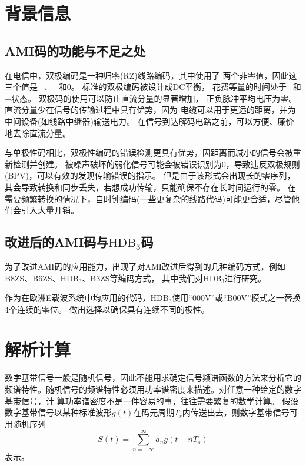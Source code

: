 \documentclass[AutoFakeBold]{LZUThesis}
\begin{document}
\section{背景信息}

\subsection{AMI码的功能与不足之处}

在电信中，双极编码是一种归零(RZ)线路编码，其中使用了
两个非零值，因此这三个值是$+$、$-$和0。
标准的双极编码被设计成DC平衡，
花费等量的时间处于$+$和$-$状态。
双极码的使用可以防止直流分量的显著增加，
正负脉冲平均电压为零。直流分量少在信号的传输过程中具有优势，因为
电缆可以用于更远的距离，并为中间设备(如线路中继器)输送电力。
在信号到达解码电路之前，可以方便、廉价地去除直流分量。\cite{enwiki:2}

与单极性码相比，双极性编码的错误检测更具有优势，因距离而减小的信号会被重新检测并创建。
被噪声破坏的弱化信号可能会被错误识别为0，导致违反双极规则(BPV)，可以有效的发现传输错误的指示。
但是由于该形式会出现长的零序列，其会导致转换和同步丢失，若想成功传输，只能确保不存在长时间运行的零。
在需要频繁转换的情况下，自时钟编码(一些更复杂的线路代码)可能更合适，尽管他们会引入大量开销。

\subsection{改进后的AMI码与$\mathrm{HDB_3}$码}

为了改进AMI码的应用能力，出现了对AMI改进后得到的几种编码方式，例如B8ZS、B6ZS、$\mathrm{HDB_3}$、B3ZS等编码方式，
其中我们对$\mathrm{HDB_3}$进行研究。

作为在欧洲E载波系统中均应用的代码，$\mathrm{HDB_3}$使用“000V”或“B00V”模式之一替换4个连续的零位。
做出选择以确保具有连续不同的极性。\cite{enwiki:1}

\section{解析计算}

数字基带信号一般是随机信号，因此不能用求确定信号频谱函数的方法来分析它的频谱特性。随机信号的频谱特性必须用功率谱密度来描述。对任意一种给定的数字基带信号，计
算功率谱密度不是一件容易的事，往往需要繁复的数学计算。
假设数字基带信号以某种标准波形$g(t)$在码元周期$ T_s $内传送出去，则数字基带信号可用随机序列
\begin{equation}
    S(t) = \sum\limits^{\infty}_{n = -\infty} a_n g(t - nT_s)
\end{equation}
表示。
\end{document}
